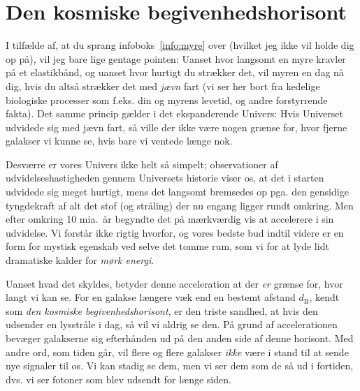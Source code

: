 \documentclass[useAMS,danish]{aa}
\begin{document}
\section{Den kosmiske begivenhedshorisont}
\label{sec:dE}
I tilfælde af, at du sprang infoboks~\ref{info:myre} over (hvilket jeg ikke vil holde dig op på), vil jeg bare lige gentage pointen:
Uanset hvor langsomt en myre kravler på et elastikbånd, og uanset hvor hurtigt du strækker det, vil myren en dag nå dig, hvis du altså strækker det med \emph{jævn} fart (vi ser her bort fra kedelige biologiske processer som f.eks. din og myrens levetid, og andre forstyrrende fakta).
Det samme princip gælder i det ekspanderende Univers:
Hvis Universet udvidede sig med jævn fart, så ville der ikke være nogen grænse for, hvor fjerne galakser vi kunne se, hvis bare vi ventede længe nok.

Desværre er vores Univers ikke helt så simpelt; observationer af udvidelseshastigheden gennem Universets historie viser os, at det i starten udvidede sig meget hurtigt, mens det langsomt bremsedes op pga. den gensidige tyngdekraft af alt det stof (og stråling) der nu engang ligger rundt omkring.
Men efter omkring 10 mia.~år begyndte det på mærkværdig vis at accelerere i sin udvidelse.
Vi forstår ikke rigtig hvorfor, og vores bedste bud indtil videre er en form for mystisk egenskab ved selve det tomme rum, som vi for at lyde lidt dramatiske kalder for \emph{mørk energi}.

Uanset hvad det skyldes, betyder denne acceleration at der \emph{er} grænse for, hvor langt vi kan se.
For en galakse længere væk end en bestemt afstand $d_\mathrm{B}$, kendt som \emph{den kosmiske begivenhedshorisont}, er den triste sandhed, at hvis den udsender en lysstråle i dag, så vil vi aldrig se den.
På grund af accelerationen bevæger galakserne sig efterhånden ud på den anden side af denne horisont.
Med andre ord, som tiden går, vil flere og flere galakser \emph{ikke} være i stand til at sende nye signaler til os.
Vi kan stadig se dem, men vi ser dem som de så ud i fortiden, dvs. vi ser fotoner som blev udsendt for længe siden.
\end{document}
